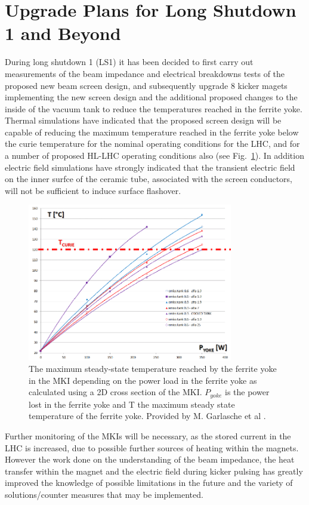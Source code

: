 \section{Upgrade Plans for Long Shutdown 1 and Beyond}

During long shutdown 1 (LS1) it has been decided to first carry out measurements of the beam impedance and electrical breakdowns tests of the proposed new beam screen design, and subsequently upgrade 8 kicker magets implementing the new screen design and the additional proposed changes to the inside of the vacuum tank to reduce the temperatures reached in the ferrite yoke. Thermal simulations have indicated that the proposed screen design will be capable of reducing the maximum temperature reached in the ferrite yoke below the curie temperature for the nominal operating conditions for the LHC, and for a number of proposed HL-LHC operating conditions also (see Fig.~\ref{fig:pow-loss-stable-temp-mkis}). In addition electric field simulations have strongly indicated that the transient electric field on the inner surfce of the ceramic tube, associated with the screen conductors, will not be sufficient to induce surface flashover. 


\begin{figure}
\begin{center}
\includegraphics[width=0.8\textwidth]{LHC_MKI/figures/tempPowMarco.png}
\end{center}
\caption{The maximum steady-state temperature reached by the ferrite yoke in the MKI depending on the power load in the ferrite yoke as calculated using a 2D cross section of the MKI. $P_{yoke}$ is the power lost in the ferrite yoke and T the maximum steady state temperature of the ferrite yoke. Provided by M. Garlasche et al \cite{Garlasche:2dHeatEmisAll}.}
\label{fig:pow-loss-stable-temp-mkis}
\end{figure} 

Further monitoring of the MKIs will be necessary, as the stored current in the LHC is increased, due to possible further sources of heating within the magnets. However the work done on the understanding of the beam impedance, the heat transfer within the magnet and the electric field during kicker pulsing has greatly improved the knowledge of possible limitations in the future and the variety of solutions/counter measures that may be implemented. 
